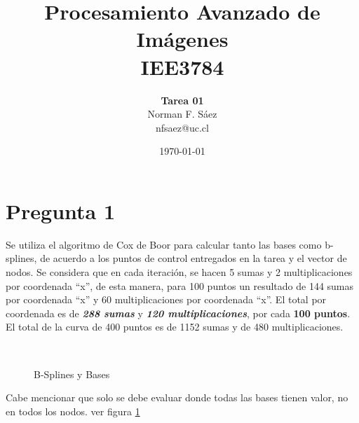 \documentclass[a4paper,10pt]{article}
\title{Procesamiento Avanzado de Imágenes\\IEE3784}
\author{\textbf{Tarea 01}\\Norman F. Sáez\\nfsaez@uc.cl}
\date{\today}
\begin{document}
\maketitle
\section{Pregunta 1}
Se utiliza el algoritmo de Cox de Boor para calcular tanto las bases como
b-splines, de acuerdo a los puntos de control entregados en la tarea y el
vector de nodos.  Se considera que en cada iteración, se hacen 5 sumas y  2
multiplicaciones por coordenada ``x'', de esta manera, para 100 puntos un resultado de
144 sumas por coordenada ``x'' y 60 multiplicaciones por
coordenada ``x''. El total por coordenada es de \textbf{\textit{288
sumas}} y \textbf{\textit{120 multiplicaciones}}, por cada \textbf{100 puntos}.
El total de la curva de 400 puntos es de 1152 sumas y de 480 multiplicaciones.

\begin{figure}[ht!]
  \centering
  ~ 
  ~ 
  \caption{B-Splines y Bases}
  \label{fig:p1}
\end{figure}
Cabe mencionar que solo se debe evaluar donde todas las bases tienen valor, no en todos los nodos. ver figura \ref{fig:p1}
\end{document}
